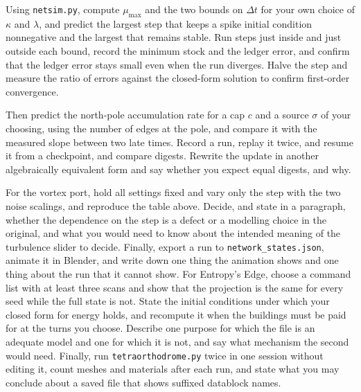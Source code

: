 \begin{exercise}
Using \texttt{netsim.py}, compute $\mu_{\max}$ and the two bounds on $\Delta t$ for your own choice of $\kappa$ and $\lambda$, and predict the largest step that keeps a spike initial condition nonnegative and the largest that remains stable. Run steps just inside and just outside each bound, record the minimum stock and the ledger error, and confirm that the ledger error stays small even when the run diverges. Halve the step and measure the ratio of errors against the closed-form solution to confirm first-order convergence.

Then predict the north-pole accumulation rate for a cap $c$ and a source $\sigma$ of your choosing, using the number of edges at the pole, and compare it with the measured slope between two late times. Record a run, replay it twice, and resume it from a checkpoint, and compare digests. Rewrite the update in another algebraically equivalent form and say whether you expect equal digests, and why.

For the vortex port, hold all settings fixed and vary only the step with the two noise scalings, and reproduce the table above. Decide, and state in a paragraph, whether the dependence on the step is a defect or a modelling choice in the original, and what you would need to know about the intended meaning of the turbulence slider to decide. Finally, export a run to \texttt{network\_states.json}, animate it in Blender, and write down one thing the animation shows and one thing about the run that it cannot show.
For Entropy's Edge, choose a command list with at least three scans and show that the projection is the same for every seed while the full state is not. State the initial conditions under which your closed form for energy holds, and recompute it when the buildings must be paid for at the turns you choose. Describe one purpose for which the file is an adequate model and one for which it is not, and say what mechanism the second would need. Finally, run \texttt{tetraorthodrome.py} twice in one session without editing it, count meshes and materials after each run, and state what you may conclude about a saved file that shows suffixed datablock names.
\end{exercise}
